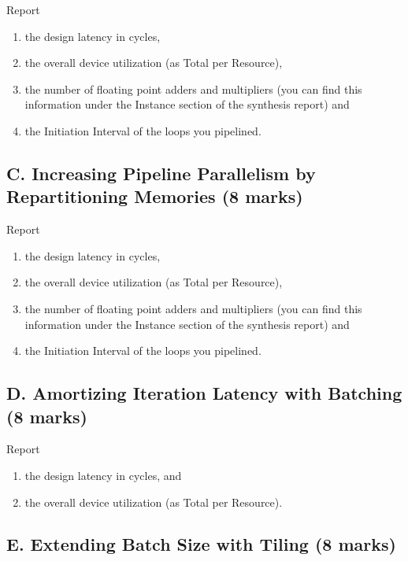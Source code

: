 Report
\begin{enumerate}
    \item the design latency in cycles,
    \item the overall device utilization (as Total per Resource),
    \item the number of floating point adders and multipliers (you can find this information under the Instance section of the synthesis report) and
    \item the Initiation Interval of the loops you pipelined.
\end{enumerate}

\subsection{C. Increasing Pipeline Parallelism by Repartitioning Memories (8 marks)}

Report
\begin{enumerate}
    \item the design latency in cycles,
    \item the overall device utilization (as Total per Resource),
    \item the number of floating point adders and multipliers (you can find this information under the Instance section of the synthesis report) and
    \item the Initiation Interval of the loops you pipelined.
\end{enumerate}

\subsection{D. Amortizing Iteration Latency with Batching (8 marks)}

Report \begin{enumerate}
    \item the design latency in cycles, and
    \item the overall device utilization (as Total per Resource).
\end{enumerate}

\subsection{E. Extending Batch Size with Tiling (8 marks)}

